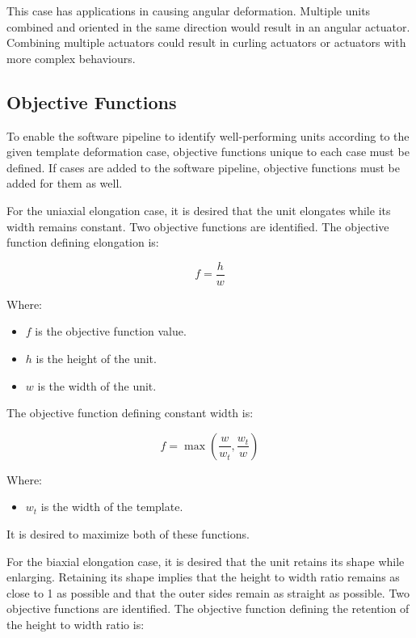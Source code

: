This case has applications in causing angular deformation. Multiple units combined and oriented in the same direction would result in an angular actuator. Combining multiple actuators could result in curling actuators or actuators with more complex behaviours.

\subsection{Objective Functions}

To enable the software pipeline to identify well-performing units according to the given template deformation case, objective functions unique to each case must be defined. If cases are added to the software pipeline, objective functions must be added for them as well.

For the uniaxial elongation case, it is desired that the unit elongates while its width remains constant. Two objective functions are identified. The objective function defining elongation is:

\begin{equation}
	f=\frac{h}{w}
\end{equation}

Where:

\begin{itemize}
	\item $f$ is the objective function value.
	\item $h$ is the height of the unit.
	\item $w$ is the width of the unit.
\end{itemize}

The objective function defining constant width is:

\begin{equation}
	f=\max\left (\frac{w}{w_{t}},\frac{w_{t}}{w} \right )
\end{equation}

Where:

\begin{itemize}
	\item $w_{t}$ is the width of the template.
\end{itemize}

It is desired to maximize both of these functions.

For the biaxial elongation case, it is desired that the unit retains its shape while enlarging. Retaining its shape implies that the height to width ratio remains as close to 1 as possible and that the outer sides remain as straight as possible. Two objective functions are identified. The objective function defining the retention of the height to width ratio is:


